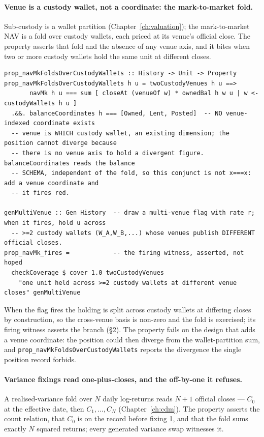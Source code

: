 \paragraph{Venue is a custody wallet, not a coordinate: the mark-to-market fold.}
Sub-custody is a wallet partition (Chapter~\ref{ch:valuation}); the mark-to-market NAV is a
fold over custody wallets, each priced at its venue's official close. The property asserts
that fold and the absence of any venue axis, and it bites when two or more custody wallets
hold the same unit at different closes.

\begin{lstlisting}
prop_navMkFoldsOverCustodyWallets :: History -> Unit -> Property
prop_navMkFoldsOverCustodyWallets h u = twoCustodyVenues h u ==>
       navMk h u === sum [ closeAt (venueOf w) * ownedBal h w u | w <- custodyWallets h u ]
  .&&. balanceCoordinates h === [Owned, Lent, Posted]  -- NO venue-indexed coordinate exists
  -- venue is WHICH custody wallet, an existing dimension; the position cannot diverge because
  -- there is no venue axis to hold a divergent figure. balanceCoordinates reads the balance
  -- SCHEMA, independent of the fold, so this conjunct is not x===x: add a venue coordinate and
  -- it fires red.

genMultiVenue :: Gen History  -- draw a multi-venue flag with rate r; when it fires, hold u across
  -- >=2 custody wallets (W_A,W_B,...) whose venues publish DIFFERENT official closes.
prop_navMk_fires =            -- the firing witness, asserted, not hoped
  checkCoverage $ cover 1.0 twoCustodyVenues
    "one unit held across >=2 custody wallets at different venue closes" genMultiVenue
\end{lstlisting}

When the flag fires the holding is split across custody wallets at differing closes by construction,
so the cross-venue basis is non-zero and the fold is exercised; its firing witness asserts the
branch (\S 2). The property fails on the
design that adds a venue coordinate: the position could then diverge from the wallet-partition sum,
and \texttt{prop\_navMkFoldsOverCustodyWallets} reports the divergence the single position record
forbids.

\paragraph{Variance fixings read one-plus-closes, and the off-by-one it refuses.}
A realised-variance fold over $N$ daily log-returns reads $N+1$ official closes ---
$C_0$ at the effective date, then $C_1,\dots,C_{N}$ (Chapter~\ref{ch:cdm}). The property
asserts the count relation, that $C_0$ is on the record before fixing 1, and that the fold
sums exactly $N$ squared returns; every generated variance swap witnesses it.

